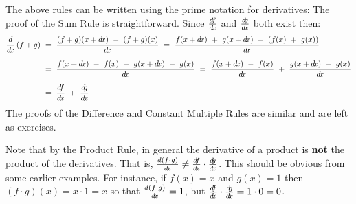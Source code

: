 The above rules can be written using the prime notation for derivatives:
The proof of the Sum Rule is straightforward. Since $\frac{d\negmedspace f}{d\!x}$ and $\frac{d\negmedspace g}{d\!x}$ both exist then:
\begin{align*}
 \ddx\,(f + g) ~&=~ \dfrac{(f + g)(x + \dx) ~-~ (f + g)(x)}{\dx} ~=~
  \dfrac{f(x + \dx) ~+~ g(x + \dx) ~-~ (f(x) ~+~ g(x))}{\dx}\\[6pt]
 &=~ \dfrac{f(x + \dx) ~-~ f(x) ~+~ g(x + \dx) ~-~ g(x)}{\dx} ~=~
  \dfrac{f(x + \dx) ~-~ f(x)}{\dx} ~+~ \dfrac{g(x + \dx) ~-~ g(x)}{\dx}\\[6pt]
 &=~ \dfdx ~+~ \dgdx  \qquad \checkmark
\end{align*}
The proofs of the Difference and Constant Multiple Rules are similar and are
left as exercises.

Note that by the Product Rule, in general the derivative of a product is
\textbf{not} the product of the derivatives. That is,
$\frac{d(f \cdot g)}{d\!x} \ne \frac{d\negmedspace f}{d\!x} \cdot \frac{d\negmedspace g}{d\!x}$.
This should be obvious from some earlier examples. For instance, if
$f(x) = x$ and $g(x) = 1$
then $(f \cdot g)(x) = x \cdot 1 = x$ so that $\frac{d(f \cdot g)}{d\!x} = 1$,
but $\frac{d\negmedspace f}{d\!x} \cdot \frac{d\negmedspace g}{d\!x} = 1 \cdot 0 = 0$.

